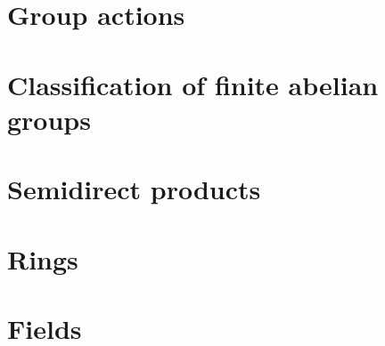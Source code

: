 \documentclass[twoside]{book}
\begin{document}
\chapter{Group actions}
\label{chapter:group-actions}


\chapter{Classification of finite abelian groups}
\label{chapter:classification-of-finite-abelian-groups}


\chapter{Semidirect products}
\label{chapter:semidirect-products}


\chapter{Rings}
\label{chapter:introduction-to-rings}



\chapter{Fields}
\label{chapter:intro-field-theory}



\backmatter
{}
\nocite{*}
\printbibliography
\end{document}
